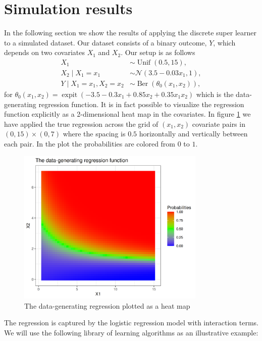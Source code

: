 \documentclass[11pt, a4paper]{article}
\theoremstyle{definition}
\theoremstyle{remark}
\DeclareMathOperator{\expit}{expit}
\begin{document}
\section{Simulation results} \label{sec:simulations}
In the following section we show the results of applying the discrete super learner to a simulated dataset. Our dataset consists of a binary outcome, $Y$, which depends on two covariates $X_1$ and $X_2$. Our setup is as follows
\begin{align*}
    X_1 &\sim \operatorname{Unif}(0.5, 15),\\
    X_2 \mid X_1 = x_1 &\sim \mathcal{N}(3.5-0.03x_1, 1),\\
    Y \mid X_1 = x_1, X_2 = x_2 &\sim \operatorname{Ber}(\theta_0(x_1, x_2)),
\end{align*}
for $\theta_0(x_1, x_2) = \expit({-3.5 - 0.3x_1 + 0.85x_2 + 0.35x_1x_2})$ which is the data-generating regression function. It is in fact possible to visualize the regression function explicitly as a 2-dimensional heat map in the covariates. In figure \ref{fig:trueplot} we have applied the true regression across the grid of $ (x_1, x_2) $ covariate pairs in $ (0, 15) \times (0,7) $ where the spacing is $ 0.5 $ horizontally and vertically between each pair. In the plot the probabilities are colored from $ 0 $ to $ 1 $. 
\begin{figure}[H]
    \centering
    \includegraphics[width=0.8\textwidth]{figures/trueplot.png}
    \caption{The data-generating regression plotted as a heat map}
    \label{fig:trueplot}
\end{figure}
The regression is captured by the logistic regression model with interaction terms. We will use the following library of learning algorithms as an illustrative example:
\end{document}
